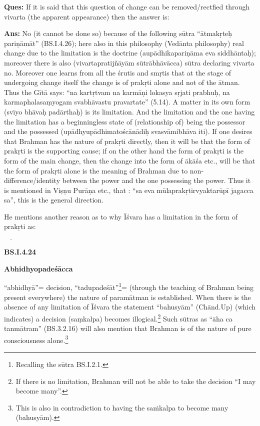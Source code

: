 \textbf{Ques:} If it is said that this question of change can be removed/rectfied  through vivarta (the apparent appearance) then the answer is:

\newpage

\textbf{Ans:} No (it cannot be done so) because of the following sūtra “ātmakṛteḥ pariṇāmāt” (BS.I.4.26); here also in this philosophy (Vedānta philosophy) real change due to the limitation is the doctrine (aupādhikapariṇāma eva siddhāntaḥ); moreover there is also (vivartapratijňāyām sūtrābhāvācca) sūtra declaring vivarta no. Moreover one learns from all the śrutis and smṛtis that at the stage of undergoing change itself the change is of prakṛti alone and not of the ātman. Thus the Gītā says: “na kartṛtvam na karmāṇi lokasya sṛjati prabhuḥ, na karmaphalasaṃyogam svabhāvastu pravartate” (5.14). A matter in its own form (svīyo bhāvaḥ padārthaḥ) is its limitation. And the limitation and the one having the limitation has a beginningless state of (relationship of) being the possessor and the possessed  (upādhyupādhimatoścānādiḥ svasvāmibhāva iti). If one desires that Brahman has the nature of prakṛti directly, then it will be that the form of prakṛti is the supporting cause; if on the other hand the form of prakṛti is the form of the main change, then the change into the form of ākāśa etc., will be that the form of prakṛti alone is the meaning of Brahman due to non-difference/identity between the power and the one possessing the power. Thus it is mentioned in Viṣṇu Purāṇa etc., that : “sa eva mūlaprakṛtirvyaktarūpī jagacca sa”, this is the general direction.

He mentions another reason as to why Īśvara has a limitation in the form of prakṛti as: 

\textbf{}


 $\underline{\qquad}$

\textbf{BS.I.4.24}

\textbf{Abhidhyopadeśācca}

“abhidhyā”= decision, “tadupadeśāt”\footnote{Recalling the sūtra BS.I.2.1.}= (through the teaching of Brahman being present everywhere) the nature of paramātman is established. When there is the absence of any limitation of Īśvara the statement “bahusyām” (Chānd.Up) (which indicates) a decision (saṃkalpa) becomes illogical.\footnote{If there is no limitation, Brahman will not be able to take the decision “I may become many”.} Such sūtras as “āha ca tanmātram” (BS.3.2.16) will also mention that Brahman is of the nature of pure consciousness alone.\footnote{This is also in contradiction to having the saṁkalpa to become many (bahusyām).}

